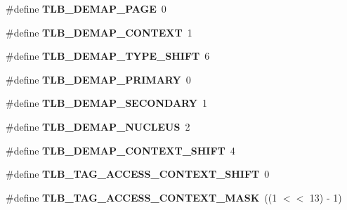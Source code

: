 \begin{DoxyCompactItemize}
\item 
\mbox{\label{group__RTEMSBSPsSPARC64mm_ga25351450ec59f7829be8fdb8da824fd0}} 
\#define {\bfseries T\+L\+B\+\_\+\+D\+E\+M\+A\+P\+\_\+\+P\+A\+GE}~0
\item 
\mbox{\label{group__RTEMSBSPsSPARC64mm_ga1b013727bac109fdc52d5ce847d922c0}} 
\#define {\bfseries T\+L\+B\+\_\+\+D\+E\+M\+A\+P\+\_\+\+C\+O\+N\+T\+E\+XT}~1
\item 
\mbox{\label{group__RTEMSBSPsSPARC64mm_gad5b962249f6f9fcc9e2107b1e4a8ef1b}} 
\#define {\bfseries T\+L\+B\+\_\+\+D\+E\+M\+A\+P\+\_\+\+T\+Y\+P\+E\+\_\+\+S\+H\+I\+FT}~6
\item 
\mbox{\label{group__RTEMSBSPsSPARC64mm_gae205306432a1347149d527ff5cc8ecd6}} 
\#define {\bfseries T\+L\+B\+\_\+\+D\+E\+M\+A\+P\+\_\+\+P\+R\+I\+M\+A\+RY}~0
\item 
\mbox{\label{group__RTEMSBSPsSPARC64mm_gac846fdf779b3024bc90b3dad96283064}} 
\#define {\bfseries T\+L\+B\+\_\+\+D\+E\+M\+A\+P\+\_\+\+S\+E\+C\+O\+N\+D\+A\+RY}~1
\item 
\mbox{\label{group__RTEMSBSPsSPARC64mm_ga776d26f81fb244ccbff841be9220a053}} 
\#define {\bfseries T\+L\+B\+\_\+\+D\+E\+M\+A\+P\+\_\+\+N\+U\+C\+L\+E\+US}~2
\item 
\mbox{\label{group__RTEMSBSPsSPARC64mm_gab593463675b0afe9572b0975fa26e4b0}} 
\#define {\bfseries T\+L\+B\+\_\+\+D\+E\+M\+A\+P\+\_\+\+C\+O\+N\+T\+E\+X\+T\+\_\+\+S\+H\+I\+FT}~4
\item 
\mbox{\label{group__RTEMSBSPsSPARC64mm_ga88570e69a3c40a72b80f61790ca27eb5}} 
\#define {\bfseries T\+L\+B\+\_\+\+T\+A\+G\+\_\+\+A\+C\+C\+E\+S\+S\+\_\+\+C\+O\+N\+T\+E\+X\+T\+\_\+\+S\+H\+I\+FT}~0
\item 
\mbox{\label{group__RTEMSBSPsSPARC64mm_ga1f73f04893fafc6f1f95a9a0532288aa}} 
\#define {\bfseries T\+L\+B\+\_\+\+T\+A\+G\+\_\+\+A\+C\+C\+E\+S\+S\+\_\+\+C\+O\+N\+T\+E\+X\+T\+\_\+\+M\+A\+SK}~((1 $<$$<$ 13) -\/ 1)
$$
\end{DoxyCompactItemize}
